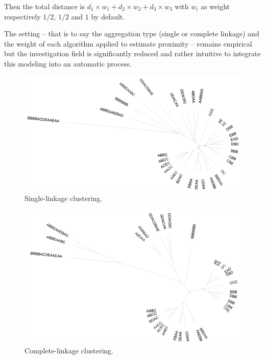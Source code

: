 Then the total distance is $d_1 \times w_1 + d_2 \times w_2 + d_3 \times w_3$ with $w_i$ as weight respectively $1/2$, $1/2$ and $1$ by default.

\smallskip

The setting -- that is to say the aggregation type (single or complete linkage) and the weight of each algorithm applied to estimate proximity -- remains empirical but the investigation field is significantly reduced and rather intuitive to integrate this modeling into an automatic process.

\smallskip

\begin{figure}[!hbt]
	\begin{center}
		\includegraphics[scale=0.47]{img/5521}
		\caption{Single-linkage clustering.}
		\label{fig:hc1}
	\end{center}
\end{figure}
	
\begin{figure}[!hbt]
	\begin{center}
		\includegraphics[scale=0.48]{img/5522}
		\caption{Complete-linkage clustering.}
		\label{fig:hc2}
	\end{center}
\end{figure}
	
